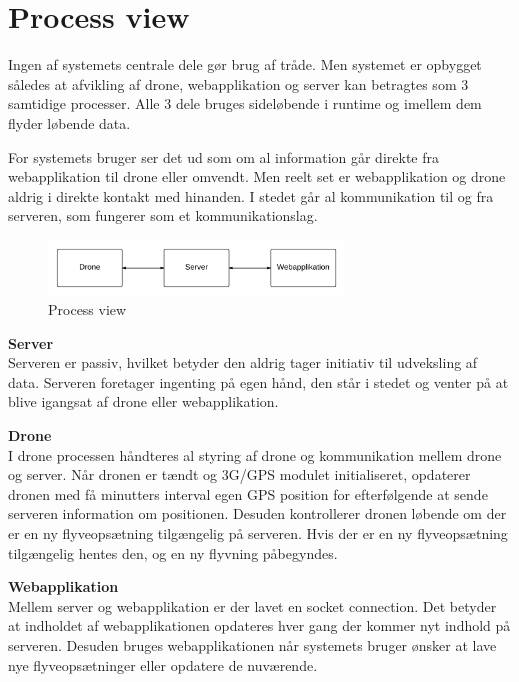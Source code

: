 \section{Process view}

Ingen af systemets centrale dele gør brug af tråde. Men systemet er opbygget således at afvikling af drone, webapplikation og server kan betragtes som 3 samtidige processer. Alle 3 dele bruges sideløbende i runtime og imellem dem flyder løbende data.

For systemets bruger ser det ud som om al information går direkte fra webapplikation til drone eller omvendt. Men reelt set er webapplikation og drone aldrig i direkte kontakt med hinanden. I stedet går al kommunikation til og fra serveren, som fungerer som et kommunikationslag. 

\vspace{-5pt}
\begin{figure}[H]
	\centering
	\includegraphics[width=0.7\textwidth]{Billeder/process_view}
	\vspace{0cm}
	\caption{Process view}
	\label{fig:process_view}
\end{figure}

\textbf{Server}\\
Serveren er passiv, hvilket betyder den aldrig tager initiativ til udveksling af data. Serveren foretager ingenting på egen hånd, den står i stedet og venter på at blive igangsat af drone eller webapplikation. 
 
\textbf{Drone} \\
I drone processen håndteres al styring af drone og kommunikation mellem drone og server. Når dronen er tændt og 3G/GPS modulet initialiseret, opdaterer dronen med få minutters interval egen GPS position for efterfølgende at sende serveren information om positionen. Desuden kontrollerer dronen løbende om der er en ny flyveopsætning tilgængelig på serveren. Hvis der er en ny flyveopsætning tilgængelig hentes den, og en ny flyvning påbegyndes. 

\textbf{Webapplikation}\\
Mellem server og webapplikation er der lavet en socket connection. Det betyder at indholdet af webapplikationen opdateres hver gang der kommer nyt indhold på serveren. Desuden bruges webapplikationen når systemets bruger ønsker at lave nye flyveopsætninger eller opdatere de nuværende.\\


